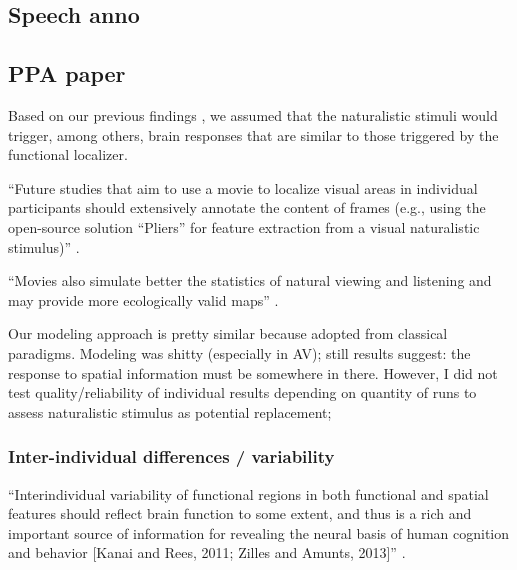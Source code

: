 \subsection{Speech anno}



\subsection{PPA paper}




Based on our previous findings \citep{haeusler2022processing}, we assumed that
the naturalistic stimuli would trigger, among others, brain responses that are
similar to those triggered by the functional localizer.

%
``Future studies that aim to use a movie to localize visual areas in individual
participants should extensively annotate the content of frames (e.g., using the
open-source solution ``Pliers''\citep{mcnamara2017developing} for feature
extraction from a visual naturalistic stimulus)''
\citep{haeusler2022processing}.

%
``Movies also simulate better the statistics of natural viewing and listening
and may provide more ecologically valid maps'' \citep{jiahui2020predicting}.

%
Our modeling approach is pretty similar because adopted from classical
paradigms.
%
Modeling was shitty (especially in AV);
%
still results suggest: the response to spatial information must be somewhere in
there.
%
However, I did not test quality/reliability of individual results depending on
quantity of runs to assess naturalistic stimulus as potential replacement;


\subsubsection{Inter-individual differences / variability}


``Interindividual variability of functional regions in both functional and
spatial features should reflect brain function to some extent, and thus is a
rich and important source of information for revealing the neural basis of human
cognition and behavior [Kanai and Rees, 2011; Zilles and Amunts, 2013]''
\citep{zhen2015quantifying}.

